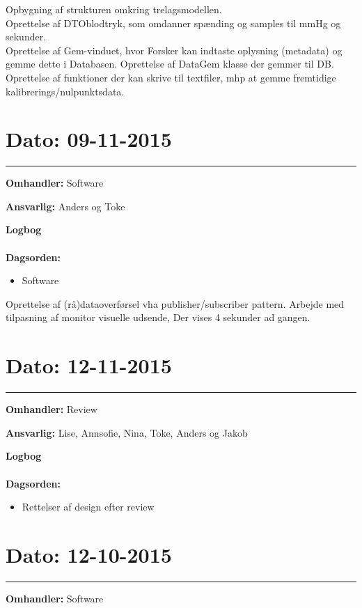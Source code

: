 Opbygning af strukturen omkring trelagsmodellen. \\
Oprettelse af DTOblodtryk, som omdanner spænding og samples til mmHg og sekunder. \\
Oprettelse af Gem-vinduet, hvor Forsker kan indtaste oplysning (metadata) og gemme dette i Databasen. 
Oprettelse af DataGem klasse der gemmer til DB.
Oprettelse af funktioner der kan skrive til textfiler, mhp at gemme fremtidige kalibrerings/nulpunktsdata.




\section{Dato: 09-11-2015 }
\hrule

\textbf{Omhandler:} Software

\textbf{Ansvarlig:} Anders og Toke

\textbf{Logbog}
\\
\\
\textbf{Dagsorden:}
\begin{itemize}
	\item Software
\end{itemize}

Oprettelse af (rå)dataoverførsel vha publisher/subscriber pattern. Arbejde med tilpasning af monitor visuelle udsende, Der vises 4 sekunder ad gangen.


\section{Dato: 12-11-2015 }
\hrule

\textbf{Omhandler:} Review 

\textbf{Ansvarlig:} Lise, Annsofie, Nina, Toke, Anders og Jakob

\textbf{Logbog}
\\
\\
\textbf{Dagsorden:}
\begin{itemize}
	\item Rettelser af design efter review
\end{itemize}



\section{Dato: 12-10-2015 }
\hrule

\textbf{Omhandler:} Software

